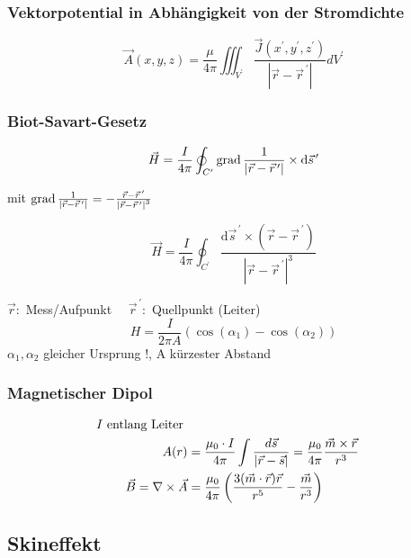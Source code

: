 \subsubsection{Vektorpotential in Abhängigkeit von der Stromdichte}
\[
    \vec{A}(x, y, z)=\frac{\mu}{4 \pi} \iiint_{V^{\prime}} \frac{\vec{J}\left(x^{\prime}, y^{\prime}, z^{\prime}\right)}{\left|\vec{r}-\vec{r}^{\,\prime}\right|} d V^{\prime}
\]

\subsubsection{Biot-Savart-Gesetz}
\[
    \vec{H}=\frac{I}{4 \pi} \oint_{C^{\prime}} \operatorname{grad} \frac{1}{\left|\vec{r}-\vec{r}^{\,\prime}\right|} \times \mathrm{d} \vec{s}^{\,\prime}
\]

mit $\operatorname{grad} \frac{1}{\left|\vec{r}-\vec{r}^{\,\prime}\right|}=-\frac{\vec{r}-\vec{r}^{\,\prime}}{\left|\vec{r}-\vec{r}^{\,\prime}\right|^{3}}$

\[
    \vec{H}=\frac{I}{4 \pi} \oint_{C^{\prime}} \frac{\mathrm{d} \vec{s}^{\,\prime} \times\left(\vec{r}-\vec{r}^{\,\prime}\right)}{\left|\vec{r}-\vec{r}^{\,\prime}\right|^{3}}
\]

{\footnotesize$\vec{r}:$ Mess/Aufpunkt $\quad \vec{r}^{\,\prime}:$ Quellpunkt (Leiter)}
\[
    H = \frac{I}{2 \pi A} ( \cos(\alpha_1) - \cos(\alpha_2))
\]
{\footnotesize$\alpha_1, \alpha_2$ gleicher Ursprung !, A kürzester Abstand}

\subsubsection{Magnetischer Dipol}


\begin{align*}
    I\textnormal{ entlang Leiter }                                                                                                                                        \\
    A(r)                            & = \frac{\mu_0 \cdot I}{4 \pi} \int \frac{d \vec{s}}{| \vec{r} - \vec{s}|} = \frac{ \mu_0}{4 \pi} \frac{\vec{m} \times \vec{r}}{r^3} \\
    \vec{B} = \nabla \times \vec{A} & = \frac{\mu_0}{4 \pi} \left(\frac{3(\vec{m} \cdot \vec{r})\vec{r}}{r^5} - \frac{\vec{m}}{r^3}\right)
\end{align*}

\newpage
\subsection{Skineffekt}

